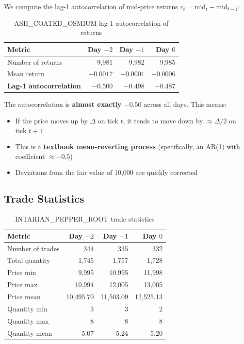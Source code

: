 \documentclass[11pt,a4paper]{article}
\begin{document}
We compute the lag-1 autocorrelation of mid-price returns $r_t = \text{mid}_t - \text{mid}_{t-1}$:

\begin{table}[H]
\centering
\caption{ASH\_COATED\_OSMIUM lag-1 autocorrelation of returns}
\begin{tabular}{@{}lrrr@{}}
\toprule
\textbf{Metric} & \textbf{Day $-2$} & \textbf{Day $-1$} & \textbf{Day $0$} \\
\midrule
Number of returns           & 9,981       & 9,982       & 9,985 \\
Mean return                 & $-0.0017$   & $-0.0001$   & $-0.0006$ \\
\textbf{Lag-1 autocorrelation}  & $\mathbf{-0.500}$ & $\mathbf{-0.498}$ & $\mathbf{-0.487}$ \\
\bottomrule
\end{tabular}
\end{table}

The autocorrelation is \textbf{almost exactly $-0.50$} across all days. This means:
\begin{itemize}
    \item If the price moves up by $\Delta$ on tick $t$, it tends to move down by $\approx \Delta / 2$ on tick $t+1$
    \item This is a \textbf{textbook mean-reverting process} (specifically, an AR(1) with coefficient $\approx -0.5$)
    \item Deviations from the fair value of 10,000 are quickly corrected
\end{itemize}

\subsection{Trade Statistics}

\begin{table}[H]
\centering
\caption{INTARIAN\_PEPPER\_ROOT trade statistics}
\begin{tabular}{@{}lrrr@{}}
\toprule
\textbf{Metric} & \textbf{Day $-2$} & \textbf{Day $-1$} & \textbf{Day $0$} \\
\midrule
Number of trades    & 344         & 335         & 332 \\
Total quantity      & 1,745       & 1,757       & 1,728 \\
Price min           & 9,995       & 10,995      & 11,998 \\
Price max           & 10,994      & 12,005      & 13,005 \\
Price mean          & 10,495.70   & 11,503.09   & 12,525.13 \\
Quantity min        & 3           & 3           & 2 \\
Quantity max        & 8           & 8           & 8 \\
Quantity mean       & 5.07        & 5.24        & 5.20 \\
\bottomrule
\end{tabular}
\end{table}
\end{document}
